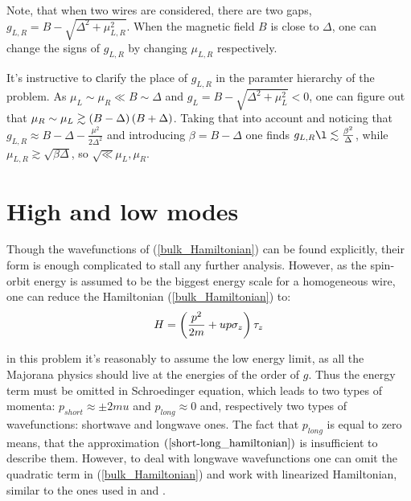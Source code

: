 Note, that when two wires are considered, there are two gaps, $ g_{L,R} = B-\sqrt{\Delta^2+\mu_{L,R}^2} $. When the magnetic field $ B $ is close to $ \Delta $, one can change the signs of $ g_{L,R} $ by changing $ \mu_{L,R} $ respectively. 

It's instructive to сlarify the place of $ g_{L,R} $ in the paramter hierarchy of the problem. As $\mu_L \sim \mu_R \ll B\sim \Delta $  and $ g_L=B-\sqrt{\Delta^2+\mu_L^2}<0 $, one can figure out that $\mu_R\sim \mu_L \gtrsim \left(B-\Delta\right)\left(B+\Delta\right) $.  Taking that into account and noticing that $ g_{L,R} \approx B-\Delta -\frac{\mu^2}{2\Delta^2}$ and introducing $ \beta=B-\Delta $ one finds $ g_{L,R}\l\lesssim \frac{\beta^2}{\Delta} $, while $ \mu_{L,R} \gtrsim\sqrt{ \beta \Delta} $, so $ \sqrt\ll \mu_{L}, \mu_R $.

\section{High and low modes}
\label{sec:high_and_low_modes}

Though the wavefunctions of (\ref{bulk_Hamiltonian}) can be found explicitly, their form is enough complicated to stall any further analysis. However, as the spin-orbit energy is assumed to be the biggest energy scale for a homogeneous wire, one can reduce the Hamiltonian (\ref{bulk_Hamiltonian}) to:
\begin{gather}
\label{short-long_hamiltonian}
	H=\left(\frac{p^2}{2m}+up\sigma_z\right)\tau_z
\end{gather}

in this problem it's reasonably to assume the low energy limit, as all the Majorana physics should live at the energies of the order of $ g $. Thus the energy term must be omitted in Schroedinger equation, which leads to two types of momenta: $ p_{short} \approx \pm 2mu$ and $ p_{long}\approx 0$ and, respectively two types of wavefunctions: shortwave and longwave ones. The fact that $ p_{long} $ is equal to zero means, that the approximation $(\ref{short-long_hamiltonian})$ is insufficient to describe them. However, to deal with longwave wavefunctions one can omit the quadratic term in (\ref{bulk_Hamiltonian}) and work with linearized Hamiltonian, similar to the ones used in \cite{Oreg_2010} and \cite{Lutchyn_2010}.